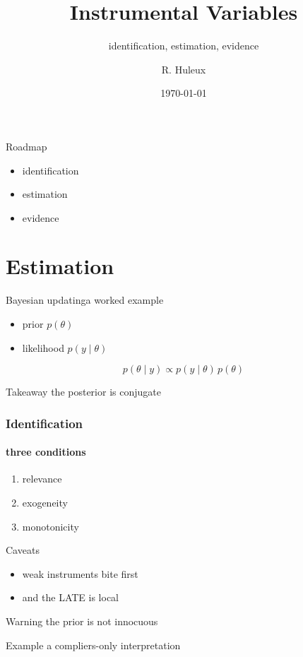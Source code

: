 \documentclass[aspectratio=169]{beamer}
\title{Instrumental Variables}
\subtitle{identification, estimation, evidence}
\author{R. Huleux}
\date{\today}
\begin{document}
\begin{frame}
    \titlepage
\end{frame}

\begin{frame}{Roadmap}
    \begin{itemize}
        \item identification
        \item estimation
        \item evidence
    \end{itemize}
\end{frame}

\section{Estimation}

\begin{frame}{Bayesian updating}{a worked example}\label{frm:bayes}

    \begin{itemize}
        \item prior $p(\theta)$
        \item likelihood $p(y \mid \theta)$
    \end{itemize}
    \[ p(\theta \mid y) \propto p(y \mid \theta)\, p(\theta) \]

    \begin{block}{Takeaway}
        the posterior is conjugate
    \end{block}

\end{frame}

\begin{frame}[t]
    \frametitle{Identification}
    \framesubtitle{three conditions}
    \begin{enumerate}
        \item relevance
        \pause
        \item exogeneity
        \pause
        \item monotonicity
    \end{enumerate}
\end{frame}

\begin{frame}{Caveats}
    \begin{itemize}
        \item<2-> weak instruments bite first
        \item<3-> and the LATE is local
    \end{itemize}

    \begin{alertblock}{Warning}
        the prior is not innocuous
    \end{alertblock}

\begin{exampleblock}{Example}
        a compliers-only interpretation
\end{exampleblock}

\end{frame}
\end{document}
